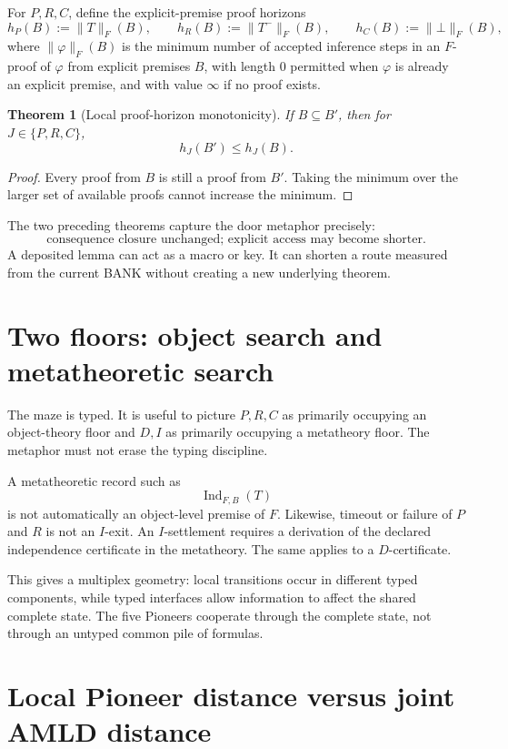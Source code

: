 \documentclass[11pt]{article}
\newtheorem{theorem}[definition]{Theorem}
\theoremstyle{remark}
\newcommand{\Ind}{\operatorname{Ind}}
\begin{document}
For $P,R,C$, define the explicit-premise proof horizons
\[
h_P(B):=\|T\|_F(B),\qquad
h_R(B):=\|T^-\|_F(B),\qquad
h_C(B):=\|\bot\|_F(B),
\]
where $\|\varphi\|_F(B)$ is the minimum number of accepted inference steps in an $F$-proof of $\varphi$ from explicit premises $B$, with length $0$ permitted when $\varphi$ is already an explicit premise, and with value $\infty$ if no proof exists.

\begin{theorem}[Local proof-horizon monotonicity]
If $B\subseteq B'$, then for $J\in\{P,R,C\}$,
\[
h_J(B')\le h_J(B).
\]
\end{theorem}
\begin{proof}
Every proof from $B$ is still a proof from $B'$. Taking the minimum over the larger set of available proofs cannot increase the minimum.
\end{proof}

The two preceding theorems capture the door metaphor precisely:
\[
\boxed{\text{consequence closure unchanged; explicit access may become shorter.}}
\]
A deposited lemma can act as a macro or key. It can shorten a route measured from the current BANK without creating a new underlying theorem.

\section{Two floors: object search and metatheoretic search}

The maze is typed. It is useful to picture $P,R,C$ as primarily occupying an object-theory floor and $D,I$ as primarily occupying a metatheory floor. The metaphor must not erase the typing discipline.

A metatheoretic record such as
\[
\Ind_{F,B}(T)
\]
is not automatically an object-level premise of $F$. Likewise, timeout or failure of $P$ and $R$ is not an $I$-exit. An $I$-settlement requires a derivation of the declared independence certificate in the metatheory. The same applies to a $D$-certificate.

This gives a multiplex geometry: local transitions occur in different typed components, while typed interfaces allow information to affect the shared complete state. The five Pioneers cooperate through the complete state, not through an untyped common pile of formulas.

\section{Local Pioneer distance versus joint AMLD distance}
\end{document}
